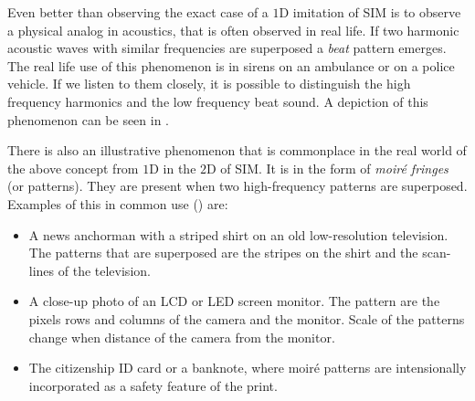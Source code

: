 \begin{marginfigure}[*-15]
    \caption{%
        We can see how the multiplication with the "illumination" affects the signal \(\noisefree\) that is generated. 
        Here, \(\alpha = 1.1\).
        It is clear from the graph, what we intuitively mean by the variation.
    }
\end{marginfigure}

Even better than observing the exact case of a \(1\)D imitation of \ac{SIM} is to observe a physical analog in
    acoustics, that is often observed in real life.
If two harmonic acoustic waves with similar frequencies are superposed a \emph{beat} pattern emerges.
The real life use of this phenomenon is in sirens on an ambulance or on a police vehicle.
If we listen to them closely, it is possible to distinguish the high frequency harmonics and the low frequency beat
    sound.
A depiction of this phenomenon can be seen in .

\begin{marginfigure}[*-4]
    \caption{Acoustic beat pattern that emerges when two close frequency harmonics are superposed.}
\end{marginfigure}

There is also an illustrative phenomenon that is commonplace in the real world of the above concept from \(1\)D in the 
    \(2\)D of \ac{SIM}.
It is in the form of \emph{moiré fringes} (or patterns).
They are present when two high-frequency patterns are superposed.
Examples of this in common use () are:
    \begin{itemize}
        \item%
            A news anchorman with a striped shirt on an old low-resolution television.
            The patterns that are superposed are the stripes on the shirt and the scan-lines of the television.
        \item%
            A close-up photo of an \acs{LCD} or \acs{LED} screen  monitor. 
            The pattern are the pixels rows and columns of the camera and the monitor. 
            Scale of the patterns change when distance of the camera from the monitor.
        \item%
            The citizenship \acs{ID} card or a banknote, where moiré patterns are intensionally incorporated as
            a safety feature of the print.
    \end{itemize}

